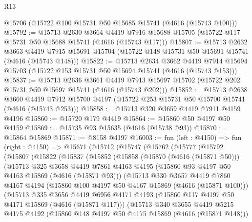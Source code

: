 \begin{lexlean}{R13}
\begin{coremodule}
    @15706
    (@15722 @100 @15731 @50 @15685 @15741 (@4616 (@15743 @100)))
@15792 := @15713
    @2630
    @3664
    @4419
    @7916
    @15688
    @15705
    (@15722 @117 @15731 @50 @15688 @15741 (@4616 (@15743 @117)))
@15807 := @15713
    @2632
    @3663
    @4419
    @7915
    @15691
    @15704
    (@15722 @148 @15731 @50 @15691 @15741 (@4616 (@15743 @148)))
@15822 := @15713
    @2634
    @3662
    @4419
    @7914
    @15694
    @15703
    (@15722 @153 @15731 @50 @15694 @15741 (@4616 (@15743 @153)))
@15837 := @15713
    @2636
    @3661
    @4419
    @7913
    @15697
    @15702
    (@15722 @202 @15731 @50 @15697 @15741 (@4616 (@15743 @202)))
@15852 := @15713
    @2638
    @3660
    @4419
    @7912
    @15700
    @4197
    (@15722 @253 @15731 @50 @15700 @15741 (@4616 (@15743 @253)))
@15858 := @15713 @320 @3659 @4419 @7911 @4159 @4196
@15860 := @15720 @179 @4419
@15864 := @15860 @50 @4197 @50 @4159
@15869 := @15735 @93 @15635 (@4616 (@15738 @93))
@15870 := @15864 @15869
@15871 := @8158 @4197
@16003 := fun (left : @4150) =>
  fun (right : @4150) =>
  @15671
    (@15712
      (@15747
        (@15762
          (@15777
            (@15792
              (@15807
                (@15822
                  (@15837
                    (@15852
                      (@15858
                        (@15870 (@4616 (@15871 @50)))
                        (@15713
                          @325
                          @3658
                          @4419
                          @7861
                          @4163
                          @4195
                          (@15860 @93 @4197 @50 @4163 @15869 (@4616 (@15871 @93)))
                          (@15713
                            @330
                            @3657
                            @4419
                            @7860
                            @4167
                            @4194
                            (@15860 @100 @4197 @50 @4167 @15869 (@4616 (@15871 @100)))
                            (@15713
                              @335
                              @3656
                              @4419
                              @6956
                              @4171
                              @4193
                              (@15860 @117 @4197 @50 @4171 @15869 (@4616 (@15871 @117)))
                              (@15713
                                @340
                                @3655
                                @4419
                                @5215
                                @4175
                                @4192
                                (@15860 @148 @4197 @50 @4175 @15869 (@4616 (@15871 @148)))

\end{coremodule}
\end{lexlean}
